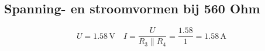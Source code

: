 \subsection{Spanning- en stroomvormen bij 560 Ohm}
\begin{equation}
U = 1.58 \, \text{V} \quad I = \frac{U}{R_3 \parallel R_4} = \frac{1.58}{1} = 1.58 \, \text{A}
\label{eq:formule 6.3}
\end{equation}
